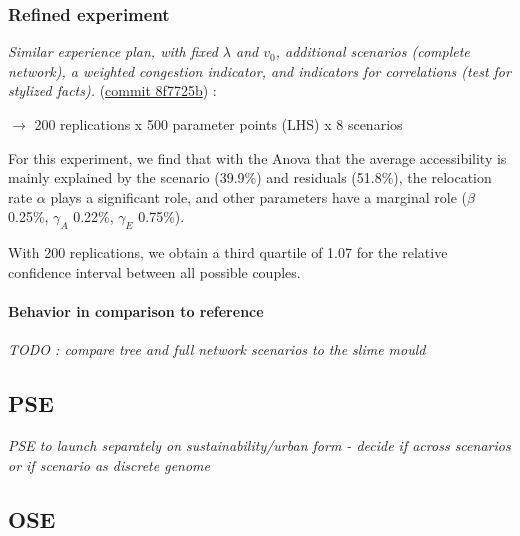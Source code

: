 \subsubsection{Refined experiment}

\textit{Similar experience plan, with fixed $\lambda$ and $v_0$, additional scenarios (complete network), a weighted congestion indicator, and indicators for correlations (test for stylized facts).} (\href{https://github.com/JusteRaimbault/Governance/commit/8f7725b982bfb3bce51a58fbd516d690556abf89}{commit 8f7725b}) :

$\rightarrow$ 200 replications x 500 parameter points (LHS) x 8 scenarios


For this experiment, we find that with the Anova that the average accessibility is mainly explained by the scenario (39.9\%) and residuals (51.8\%), the relocation rate $\alpha$ plays a significant role, and other parameters have a marginal role ($\beta$ 0.25\%, $\gamma_A$ 0.22\%, $\gamma_E$ 0.75\%).

With 200 replications, we obtain a third quartile of 1.07 for the relative confidence interval between all possible couples.






\paragraph{Behavior in comparison to reference}

\textit{TODO : compare tree and full network scenarios to the slime mould}




\subsection{PSE}

\textit{PSE to launch separately on sustainability/urban form - decide if across scenarios or if scenario as discrete genome}


\subsection{OSE}

